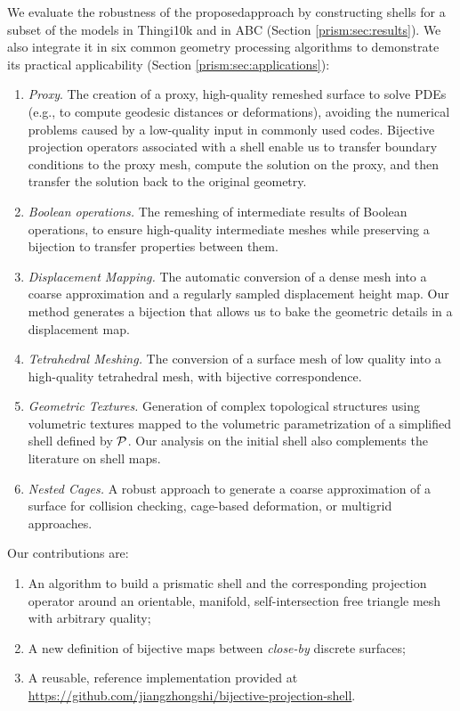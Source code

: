 We evaluate the robustness of {the proposed}approach by constructing shells for a subset of the models in Thingi10k \cite{zhou2016thingi10k} and in ABC \cite{koch2019abc} (Section \ref{prism:sec:results}). We also integrate it in six common geometry processing algorithms to demonstrate its practical applicability (Section \ref{prism:sec:applications}):
\begin{enumerate}
    \item \emph{Proxy}.
    The creation of a proxy, high-quality remeshed surface to solve PDEs (e.g., to compute geodesic distances or deformations), avoiding the numerical problems caused by a low-quality input in commonly used codes.
    Bijective projection operators associated with a shell enable us to transfer boundary conditions to the proxy mesh, compute the solution on the proxy, and then transfer the solution back to the original geometry.
    \item \emph{Boolean operations.} The remeshing of intermediate results of Boolean operations, to ensure high-quality intermediate meshes while preserving a bijection to transfer properties between them.
    \item \emph{Displacement Mapping.} The automatic conversion of a dense mesh into a coarse approximation and a regularly sampled displacement height map. Our method generates a  bijection that allows us to bake the geometric details in a displacement map.
    \item \emph{Tetrahedral Meshing.} The conversion of a surface mesh of low quality into a high-quality tetrahedral mesh, with bijective correspondence.
    \item \emph{Geometric Textures.} Generation of complex topological structures using volumetric textures mapped to the volumetric parametrization of a simplified shell defined by $\P$. Our analysis on the initial shell also complements the literature on shell maps.
    \item \emph{Nested Cages.} A robust approach to generate a coarse approximation of a surface for collision checking, cage-based deformation, or multigrid approaches.
\end{enumerate}

Our contributions are:
\begin{enumerate}
    \item An algorithm to build a prismatic shell and the corresponding projection operator around an orientable, manifold, self-intersection free triangle mesh with arbitrary quality;
    \item A new definition of bijective maps between {\emph{close-by} discrete} surfaces;%
    \item A reusable, reference implementation {provided at \url{https://github.com/jiangzhongshi/bijective-projection-shell}}.
\end{enumerate}
